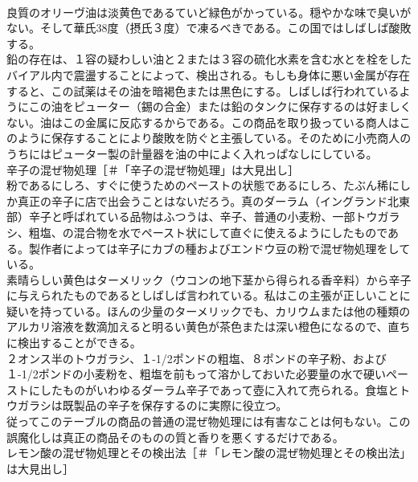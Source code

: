 \documentclass[8pt]{extreport}
\begin{document}
\begin{CJK}{UTF8}{min}
\\	良質のオリーヴ油は淡黄色であるていど緑色がかっている。穏やかな味で臭いがない。そして華氏38度（摂氏３度）で凍るべきである。この国ではしばしば酸敗する。
\\	鉛の存在は、１容の疑わしい油と２または３容の硫化水素を含む水とを栓をしたバイアル内で震盪することによって、検出される。もしも身体に悪い金属が存在すると、この試薬はその油を暗褐色または黒色にする。しばしば行われているようにこの油をピューター（錫の合金）または鉛のタンクに保存するのは好ましくない。油はこの金属に反応するからである。この商品を取り扱っている商人はこのように保存することにより酸敗を防ぐと主張している。そのために小売商人のうちにはピューター製の計量器を油の中によく入れっぱなしにしている。
\\	辛子の混ぜ物処理［＃「辛子の混ぜ物処理」は大見出し］
\\	粉であるにしろ、すぐに使うためのペーストの状態であるにしろ、たぶん稀にしか真正の辛子に店で出会うことはないだろう。真のダーラム（イングランド北東部）辛子と呼ばれている品物はふつうは、辛子、普通の小麦粉、一部トウガラシ、粗塩、の混合物を水でペースト状にして直ぐに使えるようにしたものである。製作者によっては辛子にカブの種およびエンドウ豆の粉で混ぜ物処理をしている。
\\	素晴らしい黄色はターメリック（ウコンの地下茎から得られる香辛料）から辛子に与えられたものであるとしばしば言われている。私はこの主張が正しいことに疑いを持っている。ほんの少量のターメリックでも、カリウムまたは他の種類のアルカリ溶液を数滴加えると明るい黄色が茶色または深い橙色になるので、直ちに検出することができる。
\\	２オンス半のトウガラシ、１-1/2ポンドの粗塩、８ポンドの辛子粉、および１-1/2ポンドの小麦粉を、粗塩を前もって溶かしておいた必要量の水で硬いペーストにしたものがいわゆるダーラム辛子であって壺に入れて売られる。食塩とトウガラシは既製品の辛子を保存するのに実際に役立つ。
\\	従ってこのテーブルの商品の普通の混ぜ物処理には有害なことは何もない。この誤魔化しは真正の商品そのものの質と香りを悪くするだけである。
\\	レモン酸の混ぜ物処理とその検出法［＃「レモン酸の混ぜ物処理とその検出法」は大見出し］

\end{CJK}
\end{document}
